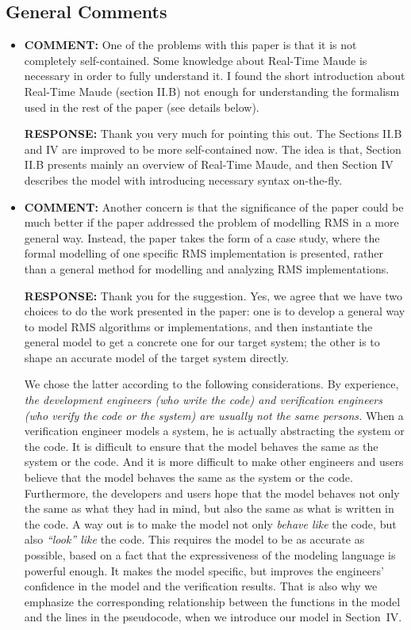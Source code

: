 \documentclass[10pt,journal]{IEEEtran}
\newcommand{\ANSWER}{{\bf RESPONSE: }}
\newcommand{\COMMENT}{{\bf COMMENT: }}
\begin{document}
\subsection{General Comments}
\begin{itemize}
\item
\COMMENT One of the problems with this paper is that it is not
completely self-contained.  Some knowledge about Real-Time Maude is
necessary in order to fully understand it.  I found the short
introduction about Real-Time Maude (section II.B) not enough for
understanding the formalism used in the rest of the paper (see details
below).

\ANSWER Thank you very much for pointing this out. The Sections II.B
and IV are improved to be more self-contained now. The idea is that,
Section II.B presents mainly an overview of Real-Time Maude, and then
Section IV describes the model with introducing necessary syntax
on-the-fly.

\item
\COMMENT Another concern is that the significance of the paper could
be much better if the paper addressed the problem of modelling RMS in
a more general way. Instead, the paper takes the form of a case study,
where the formal modelling of one specific RMS implementation is
presented, rather than a general method for modelling and analyzing
RMS implementations.

\ANSWER Thank you for the suggestion. Yes, we agree that we have two
choices to do the work presented in the paper: one is to develop a
general way to model RMS algorithms or implementations, and then
instantiate the general model to get a concrete one for our target
system; the other is to shape an accurate model of the target system
directly. 

We chose the latter according to the following considerations. By
experience, \emph{the development engineers (who write the code) and
  verification engineers (who verify the code or the system) are
  usually not the same persons.} When a verification engineer models a
system, he is actually abstracting the system or the code. It is
difficult to ensure that the model behaves the same as the system or
the code.  And it is more difficult to make other engineers and users
believe that the model behaves the same as the system or the
code. Furthermore, the developers and users hope that the model
behaves not only the same as what they had in mind, but also the same
as what is written in the code. A way out is to make the model not
only \emph{behave like} the code, but also \emph{``look'' like} the
code. This requires the model to be as accurate as possible, based on
a fact that the expressiveness of the modeling language is powerful
enough. It makes the model specific, but improves the engineers'
confidence in the model and the verification results. That is also why
we emphasize the corresponding relationship between the functions in
the model and the lines in the pseudocode, when we introduce our model
in Section~IV.


\end{itemize}
\end{document}
